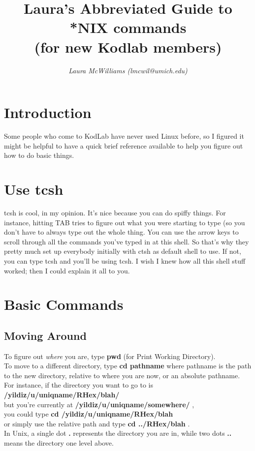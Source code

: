\documentclass[12pt, letterpaper]{article}
\begin{document}
\title{\bf {\Large Laura's Abbreviated Guide to *NIX commands}\\ 
           {\large (for new Kodlab members)}}
\author{\large \it Laura McWilliams (lmcwil@umich.edu)}
\maketitle 

\section*{Introduction}
Some people who come to KodLab have never used Linux before,
so I figured it might be helpful to have a quick brief reference
available to help you figure out how to do basic things.

\section{Use tcsh}
tcsh is cool, in my opinion. It's nice because you can do spiffy
things. For instance,
hitting TAB tries to figure out what you were starting to type (so you 
don't have to always type out the whole thing.
You can use the arrow keys to scroll through all the commands you've
typed in at this shell.
So that's why they pretty much set up everybody initially with ctsh as 
default shell to use. If not, you can type tcsh and you'll be using
tcsh. I wish I knew how all this shell stuff worked; then I could
explain it all to you.

\section{Basic Commands}

\subsection{Moving Around}
To figure out {\it where} you are, type {\bf pwd} (for Print Working
Directory).\\
To move to a different directory, type {\bf cd pathname} where
pathname is the path to the new directory, relative to where you are
now, or an absolute pathname. For instance, if the directory you want
to go to is\\
 {\bf /yildiz/u/uniqname/RHex/blah/ }\\
 but you're currently at {\bf /yildiz/u/uniqname/somewhere/ },\\
 you could type {\bf cd /yildiz/u/uniqname/RHex/blah }\\
 or simply use the relative path
and type {\bf cd ../RHex/blah }.\\
In Unix, a single dot {\bf .} represents the directory you are in,
while two dots {\bf ..} means the directory one level above. 
\end{document}
